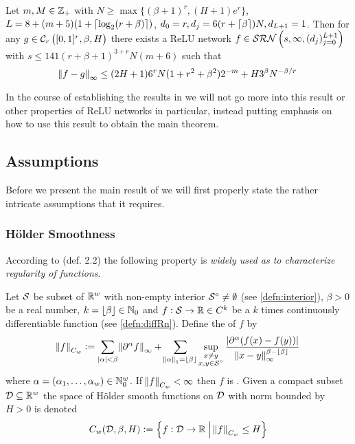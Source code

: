 \begin{lem}
  Let $m,M \in \mathbb{Z}_+$ with $N \geq \max\{(\beta + 1)^r, (H + 1) e^r\}$,
  $L = 8 + (m + 5) (1 + \lceil\log_2(r + \beta)\rceil)$, 
  $d_0 = r, d_j = 6(r + \lceil\beta\rceil) N, d_{L+1} = 1$.
  Then for any $g \in \mathcal{C}_r \left( [0,1]^r, \beta, H \right)$
  there exists a ReLU network
  $f \in \mathcal{SRN}\left(s, \infty, (d_j)_{j=0}^{L+1} \right)$
  with $s \leq 141 (r + \beta + 1)^{3 + r} N (m+6)$
  such that
  \begin{equation*}
    \norm{f - g}_\infty \leq (2 H + 1) 6^r N (1 + r^2 + \beta^2) 2^{-m}
    + H 3^{\beta} N^{-\beta/r}
  \end{equation*}
  \label{lem:holderapprox} 
\end{lem} 
\vspace*{-\baselineskip}

In the course of establishing the results in  we will not go
more into this result or other properties of ReLU networks in particular,
instead putting emphasis on how to use this result to obtain the main
theorem.

\subsection{Assumptions}

Before we present the main result of 
we will first properly state the rather
intricate assumptions that it requires.

\subsubsection{Hölder Smoothness}
According to  (def. 2.2) the following property is
\emph{widely used as to characterize regularity of functions}.
\begin{defn}
  Let $\mathcal{S}$ be subset of $\mathbb{R}^w$ with non-empty interior
  $\mathcal{S}^\circ \neq \emptyset$
  (see \cref{defn:interior}),
  $\beta > 0$ be a real number, $k = \lfloor\beta\rfloor \in \mathbb{N}_0$
  and $f : \mathcal{S} \to \mathbb{R} \in C^k$ be a $k$ times continuously
  differentiable function (see \cref{defn:diffRn}). Define
  the  of $f$ by
  \begin{equation}
    \norm{f}_{C_w} \vcentcolon= 
    \sum_{|{\alpha}| < \beta}
    \norm{\partial^{\alpha}f}_\infty +
    \sum_{\norm{{\alpha}}_1 = \lfloor\beta\rfloor}
    \sup_{\substack{x \neq y \\ x, y \in \mathcal{S}^\circ}}
    \frac{|\partial^\alpha (f(x) - f(y))|}
  {\norm{x-y}_\infty^{\beta-\lfloor\beta\rfloor}}
  \end{equation}
  where $\alpha = (\alpha_1, \dots, \alpha_w) \in \mathbb{N}_0^w$.
  If $\norm{f}_{C_w} < \infty$ then $f$ is .
  Given a compact subset $\mathcal{D} \subseteq \mathbb{R}^w$
  the space of Hölder smooth functions on $\mathcal{D}$ with norm bounded by
  $H > 0$ is denoted
  \[ C_w(\mathcal{D}, \beta, H) \vcentcolon=
  \left\{ f : \mathcal{D} \to \mathbb{R} \;\middle\vert\; \norm{f}_{C_w} \leq H \right\} \]
  \label{defn:holdersmooth}
\end{defn}

